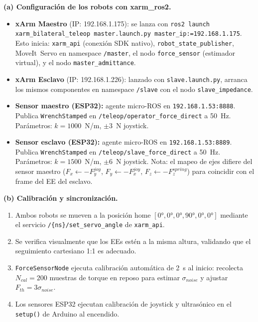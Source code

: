 \documentclass[journal,10pt,twoside]{IEEEtran}
\begin{document}
\textbf{(a) Configuración de los robots con xarm\_ros2.}
\begin{itemize}
  \item \textbf{xArm Maestro} (IP: 192.168.1.175): se lanza con
        \texttt{ros2 launch xarm\_bilateral\_teleop master.launch.py
        master\_ip:=192.168.1.175}. Esto inicia: \texttt{xarm\_api}
        (conexión SDK nativo), \texttt{robot\_state\_publisher},
        MoveIt~Servo en namespace \texttt{/master}, el nodo
        \texttt{force\_sensor} (estimador virtual), y el nodo
        \texttt{master\_admittance}.
  \item \textbf{xArm Esclavo} (IP: 192.168.1.226): lanzado con
        \texttt{slave.launch.py}, arranca los mismos componentes en
        namespace \texttt{/slave} con el nodo \texttt{slave\_impedance}.
  \item \textbf{Sensor maestro (ESP32):} agente micro-ROS en
        \texttt{192.168.1.53:8888}. Publica \texttt{WrenchStamped}
        en \texttt{/teleop/operator\_force\_direct} a 50~Hz.
        Parámetros: $k=1000$~N/m, $\pm3$~N joystick.
  \item \textbf{Sensor esclavo (ESP32):} agente micro-ROS en
        \texttt{192.168.1.53:8889}. Publica \texttt{WrenchStamped}
        en \texttt{/teleop/slave\_force\_direct} a 50~Hz.
        Parámetros: $k=1500$~N/m, $\pm6$~N joystick.
        Nota: el mapeo de ejes difiere del sensor maestro
        ($F_x \leftarrow -F_y^{joy}$, $F_y \leftarrow -F_x^{joy}$,
        $F_z \leftarrow -F_z^{spring}$) para coincidir con el
        frame del EE del esclavo.
\end{itemize}

\textbf{(b) Calibración y sincronización.}
\begin{enumerate}[label=\roman*.]
  \item Ambos robots se mueven a la posición home
        $[0°, 0°, 0°, 90°, 0°, 0°]$ mediante el servicio
        \texttt{/\{ns\}/set\_servo\_angle} de \texttt{xarm\_api}.
  \item Se verifica visualmente que los EEs estén a la misma altura,
        validando que el seguimiento cartesiano 1:1 es adecuado.
  \item \texttt{ForceSensorNode} ejecuta calibración automática de
        2~s al inicio: recolecta $N_{cal} = 200$ muestras de torque
        en reposo para estimar $\sigma_{noise}$ y ajustar
        $F_{th} = 3\sigma_{noise}$.
  \item Los sensores ESP32 ejecutan calibración de joystick y
        ultrasónico en el \texttt{setup()} de Arduino al encendido.
\end{enumerate}
\end{document}

